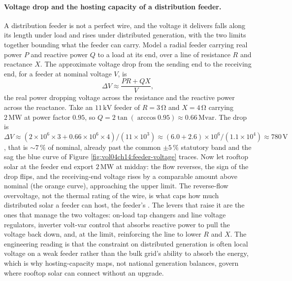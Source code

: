 \paragraph{Voltage drop and the hosting capacity of a distribution feeder.} A
distribution feeder is not a perfect wire, and the voltage it delivers falls
along its length under load and rises under distributed generation, with the
two limits together bounding what the feeder can carry. Model a radial feeder
carrying real power $P$ and reactive power $Q$ to a load at its end, over a line
of resistance $R$ and reactance $X$. The approximate voltage drop from the
sending end to the receiving end, for a feeder at nominal voltage $V$, is
\[
\Delta V \approx \frac{P R + Q X}{V},
\]
the real power dropping voltage across the resistance and the reactive power
across the reactance. Take an $11\,\si{\kilo\volt}$ feeder of
$R = 3\,\si{\ohm}$ and $X = 4\,\si{\ohm}$ carrying $2\,\si{\mega\watt}$ at
power factor $0.95$, so $Q = 2\tan(\arccos 0.95) \approx 0.66\,\text{Mvar}$.
The drop is $\Delta V \approx (2\times 10^6\times 3 + 0.66\times 10^6\times 4)/
(11\times 10^3) \approx (6.0 + 2.6)\times 10^6/(1.1\times 10^4) \approx
780\,\si{\volt}$, that is $\sim 7\,\%$ of nominal, already past the common
$\pm 5\,\%$ statutory band and the sag the blue curve of Figure
\ref{fig:vol04ch14:feeder-voltage} traces. Now let rooftop solar at the feeder
end export $2\,\si{\mega\watt}$ at midday: the flow reverses, the sign of the
drop flips, and the receiving-end voltage rises by a comparable amount above
nominal (the orange curve), approaching the upper limit. The reverse-flow
overvoltage, not the thermal rating of the wire, is what caps how much
distributed solar a feeder can host, the feeder's .
The levers that raise it are the ones that manage the two voltages: on-load tap
changers and line voltage regulators, inverter volt-var control that absorbs
reactive power to pull the voltage back down, and, at the limit, reinforcing
the line to lower $R$ and $X$. The engineering reading is that the constraint on
distributed generation is often local voltage on a weak feeder rather than the
bulk grid's ability to absorb the energy, which is why hosting-capacity maps,
not national generation balances, govern where rooftop solar can connect
without an upgrade.



